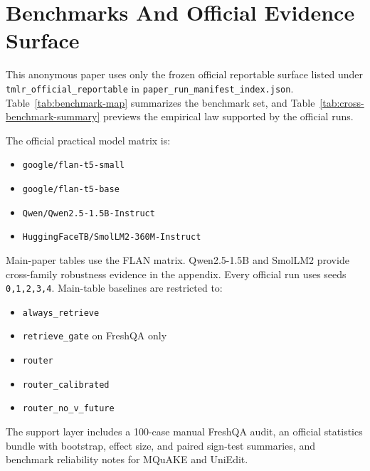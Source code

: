 \section{Benchmarks And Official Evidence Surface}

This anonymous paper uses only the frozen official reportable surface listed under \texttt{tmlr\_official\_reportable} in \texttt{paper\_run\_manifest\_index.json}. Table~\ref{tab:benchmark-map} summarizes the benchmark set, and Table~\ref{tab:cross-benchmark-summary} previews the empirical law supported by the official runs.

\begin{table}[h]
\centering
\scriptsize

\caption{Official benchmark map for the TMLR submission. The main evidence surface covers stable recurrence, volatile public knowledge, propagation, and broad editing.}
\label{tab:benchmark-map}
\end{table}

\begin{table}[h]
\centering
\scriptsize

\caption{Cross-benchmark summary from the frozen official bundles. The important result is a boundary law for delayed utility, not broad router superiority.}
\label{tab:cross-benchmark-summary}
\end{table}

The official practical model matrix is:
\begin{itemize}[leftmargin=1.5em]
\item \texttt{google/flan-t5-small}
\item \texttt{google/flan-t5-base}
\item \texttt{Qwen/Qwen2.5-1.5B-Instruct}
\item \texttt{HuggingFaceTB/SmolLM2-360M-Instruct}
\end{itemize}

Main-paper tables use the FLAN matrix. Qwen2.5-1.5B and SmolLM2 provide cross-family robustness evidence in the appendix. Every official run uses seeds \texttt{0,1,2,3,4}. Main-table baselines are restricted to:
\begin{itemize}[leftmargin=1.5em]
\item \texttt{always\_retrieve}
\item \texttt{retrieve\_gate} on FreshQA only
\item \texttt{router}
\item \texttt{router\_calibrated}
\item \texttt{router\_no\_v\_future}
\end{itemize}

The support layer includes a 100-case manual FreshQA audit, an official statistics bundle with bootstrap, effect size, and paired sign-test summaries, and benchmark reliability notes for MQuAKE and UniEdit.
